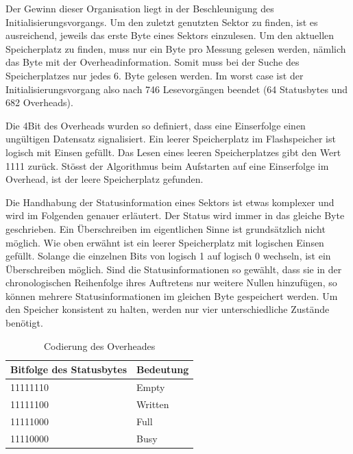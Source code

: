 Der Gewinn dieser Organisation liegt in der Beschleunigung des Initialisierungsvorgangs. Um den zuletzt genutzten Sektor zu finden, ist es ausreichend, jeweils das erste Byte eines Sektors einzulesen. Um den aktuellen Speicherplatz zu finden, muss nur ein Byte pro Messung gelesen werden, nämlich das Byte mit der Overheadinformation. Somit muss bei der Suche des Speicherplatzes nur jedes 6. Byte gelesen werden. Im \glqq worst case\grqq{}  ist der Initialisierungsvorgang also nach 746 Lesevorgängen beendet (64 Statusbytes und 682 Overheads).

Die 4Bit des Overheads wurden so definiert, dass eine Einserfolge einen ungültigen Datensatz signalisiert. Ein leerer Speicherplatz im Flashspeicher ist logisch mit Einsen gefüllt. Das Lesen eines leeren Speicherplatzes gibt den Wert  1111\grqq{}   zurück. Stösst der Algorithmus beim Aufstarten auf eine Einserfolge im Overhead, ist der leere Speicherplatz gefunden. 

Die Handhabung der Statusinformation eines Sektors ist etwas komplexer und wird im Folgenden genauer erläutert. Der Status wird immer in das gleiche Byte geschrieben. Ein Überschreiben im eigentlichen Sinne ist grundsätzlich nicht möglich. Wie oben erwähnt ist ein leerer Speicherplatz mit logischen Einsen gefüllt. Solange die einzelnen Bits von logisch 1 auf logisch 0 wechseln, ist ein Überschreiben möglich. Sind die Statusinformationen so gewählt, dass sie in der chronologischen Reihenfolge ihres Auftretens nur weitere Nullen hinzufügen, so können mehrere Statusinformationen im gleichen Byte gespeichert werden. Um den Speicher konsistent zu halten, werden nur vier unterschiedliche Zustände benötigt.

\begin{table}[H]
\begin{center}
\begin{tabular}{|l|l|}
\hline
Bitfolge des Statusbytes & Bedeutung \\ \hline
11111110                 & Empty     \\ \hline
11111100                 & Written   \\ \hline
11111000                 & Full      \\ \hline
11110000                 & Busy      \\ \hline
\end{tabular}
\caption{Codierung des Overheades}
\label{tab:Codierung_des_Overheades}
\end{center}
\end{table}

